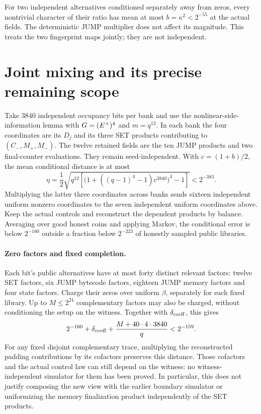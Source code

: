 \documentclass[11pt]{article}
\begin{document}
For two independent alternatives conditioned separately away from zeros, every nontrivial character of their ratio has mean at most $b=\kappa^2<2^{-55}$ at the actual fields. The deterministic JUMP multiplier does not affect its magnitude. This treats the two fingerprint maps jointly; they are not independent.

\section{Joint mixing and its precise remaining scope}

Take $3840$ independent occupancy bits per bank and use the nonlinear-side-information lemma with $G=(E^\times)^4$ and $m=q^{12}$. In each bank the four coordinates are its $D_j$ and its three SET products contributing to $(C_-,M_+,M_-)$. The twelve retained fields are the ten JUMP products and two final-counter evaluations. They remain seed-independent. With $c=(1+b)/2$, the mean conditional distance is at most
\[
 \eta=\frac12\sqrt{q^{12}\left[
  \bigl(1+((q-1)^4-1)c^{3840}\bigr)^4-1\right]}<2^{-383}.
\]
Multiplying the latter three coordinates across banks sends sixteen independent uniform nonzero coordinates to the seven independent uniform coordinates above. Keep the actual controls and reconstruct the dependent products by balance. Averaging over good honest coins and applying Markov, the conditional error is below $2^{-160}$ outside a fraction below $2^{-223}$ of honestly sampled public libraries.

\paragraph{Zero factors and fixed completion.} Each bit's public alternatives have at most forty distinct relevant factors: twelve SET factors, six JUMP bytecode factors, eighteen JUMP memory factors and four state factors. Charge their zeros over uniform $\beta$, separately for each fixed library. Up to $M\le2^{24}$ complementary factors may also be charged, without conditioning the setup on the witness. Together with $\delta_{\rm coeff}$, this gives
\[
 2^{-160}+\delta_{\rm coeff}+\frac{M+40\cdot4\cdot3840}{q}<2^{-159}.
\]
For any fixed disjoint complementary trace, multiplying the reconstructed padding contributions by its cofactors preserves this distance. Those cofactors and the actual control law can still depend on the witness: no witness-independent simulator for them has been proved. In particular, this does not justify composing the new view with the earlier boundary simulator or uniformizing the memory finalization product independently of the SET products.
\end{document}
